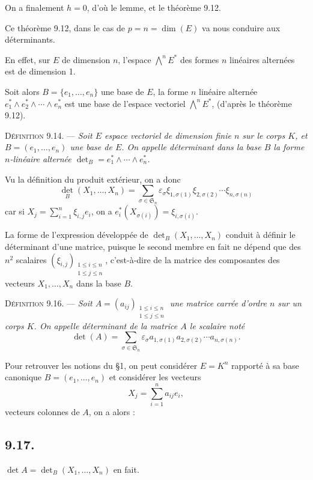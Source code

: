 On a finalement $h=0$, d'où le lemme, et le théorème 9.12. \bookend

Ce théorème 9.12, dans le cas de $p=n=\dim(E)$ va nous conduire aux déterminants.

En effet, sur $E$ de dimension $n$, l'espace $\bigwedge^nE^*$ des formes $n$ linéaires alternées est de dimension 1.

Soit alors $B=\{e_1,\ldots,e_n\}$ une base de $E$, la forme $n$ linéaire alternée $e_1^*\wedge e_2^*\wedge\cdots\wedge e_n^*$ est une base de l'espace vectoriel $\bigwedge^nE^*$, (d'après le théorème 9.12).

\medskip\noindent\textsc{Définition 9.14.} --- \emph{Soit $E$ espace vectoriel de dimension finie $n$ sur le corps $K$, et $B=(e_1,\ldots,e_n)$ une base de $E$. On appelle déterminant dans la base $B$ la forme $n$-linéaire alternée $\det_B=e_1^*\wedge\cdots\wedge e_n^*$.}

Vu la définition du produit extérieur, on a donc
\[
\tag{9.15}
\det_B(X_1,\ldots,X_n)=\sum_{\sigma\in\mathfrak S_n}\varepsilon_\sigma
\xi_{1,\sigma(1)}\xi_{2,\sigma(2)}\cdots\xi_{n,\sigma(n)}
\]
car si $X_j=\sum_{i=1}^n\xi_{i,j}e_i$, on a $e_i^*(X_{\sigma(i)})=\xi_{i,\sigma(i)}$.


La forme de l'expression développée de $\det_B(X_1,\ldots,X_n)$ conduit à définir le déterminant d'une matrice, puisque le second membre en fait ne dépend que des $n^2$ scalaires $(\xi_{i,j})_{\substack{1\le i\le n\\1\le j\le n}}$, c'est-à-dire de la matrice des composantes des vecteurs $X_1,\ldots,X_n$ dans la base $B$.

\medskip\noindent\textsc{Définition 9.16.} --- \emph{Soit $A=(a_{ij})_{\substack{1\le i\le n\\1\le j\le n}}$ une matrice carrée d'ordre $n$ sur un corps $K$. On appelle déterminant de la matrice $A$ le scalaire noté}
\[
\det(A)=\sum_{\sigma\in\mathfrak S_n}\varepsilon_\sigma a_{1,\sigma(1)}a_{2,\sigma(2)}\cdots a_{n,\sigma(n)}.
\]

Pour retrouver les notions du §1, on peut considérer $E=K^n$ rapporté à sa base canonique $B=(e_1,\ldots,e_n)$ et considérer les vecteurs
\[
X_j=\sum_{i=1}^na_{ij}e_i,
\]
vecteurs colonnes de $A$, on a alors :

\subsection*{9.17.}
$\det A=\det_B(X_1,\ldots,X_n)$ en fait.

